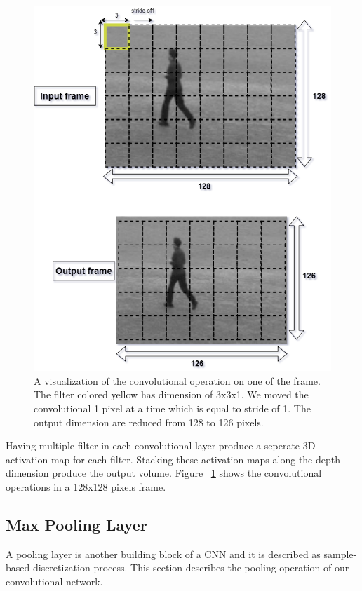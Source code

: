 \begin{figure}[ht]
\centering
\includegraphics[width=0.8\columnwidth]{Figures/d1.png}
\decoRule
\caption[A visualization of the convolutional operation on one of the frame. The filter colored yellow has dimension of 3x3x1. We moved the convolutional 1 pixel at a time which is equal to stride of 1.]{A visualization of the convolutional operation on one of the frame. The filter colored yellow has dimension of 3x3x1. We moved the convolutional 1 pixel at a time which is equal to stride of 1. The output dimension are reduced from 128 to 126 pixels.}
\label{fig:la2la22}
\end{figure}

Having multiple filter in each convolutional layer produce a seperate 3D activation map for each filter. Stacking these activation maps along the depth dimension produce the output volume. Figure ~\ref{fig:la2la22} shows the convolutional operations in a 128x128 pixels frame.

\subsection{Max Pooling Layer}
\hspace{5mm} A pooling layer is another building block of a CNN and it is described as sample-based discretization process. This section describes the pooling operation of our convolutional network.\\

